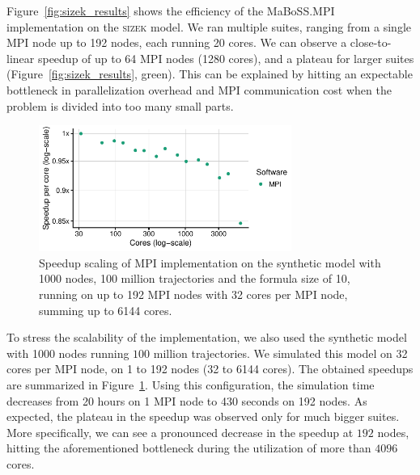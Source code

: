 \documentclass[sn-mathphys-num]{sn-jnl}%
\begin{document}
Figure~\ref{fig:sizek_results} shows the efficiency of the MaBoSS.MPI implementation on the \textsc{sizek} model. We ran multiple suites, ranging from a single MPI node up to 192 nodes, each running 20 cores. We can observe a close-to-linear speedup of up to 64 MPI nodes (1280 cores), and a plateau for larger suites (Figure~\ref{fig:sizek_results}, green). This can be explained by hitting an expectable bottleneck in parallelization overhead and MPI communication cost when the problem is divided into too many small parts.

\begin{figure}%
\centering
\includegraphics[width=3.25in]{plots/synth_mpi_speedup.pdf}
\caption{Speedup scaling of MPI implementation on the synthetic model with 1000 nodes, 100 million trajectories and the formula size of 10, running on up to 192 MPI nodes with 32 cores per MPI node, summing up to 6144 cores.}
\label{fig:synthetic_results}
\end{figure}

To stress the scalability of the implementation, we also used the synthetic model with 1000 nodes running $100$ million trajectories. We simulated this model on 32 cores per MPI node, on 1 to 192 nodes (32 to 6144 cores). The obtained speedups are summarized in Figure~\ref{fig:synthetic_results}. Using this configuration, the simulation time decreases from 20 hours on 1 MPI node to 430 seconds on 192 nodes. As expected, the plateau in the speedup was observed only for much bigger suites. More specifically, we can see a pronounced decrease in the speedup at $192$ nodes, hitting the aforementioned bottleneck during the utilization of more than $4096$ cores.

\end{document}
